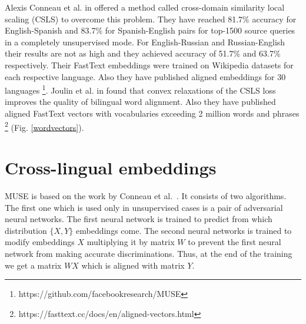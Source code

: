 \documentclass[11pt,a4paper]{article}
\begin{document}
Alexis Conneau et al. in \citeyear{muse} offered a method called cross-domain similarity local scaling (CSLS) to overcome this problem. They have reached 81.7\% accuracy for English-Spanish and 83.7\% for Spanish-English pairs for top-1500 source queries in a completely unsupervised mode. For English-Russian and Russian-English their results are not as high and they achieved accuracy of 51.7\% and 63.7\% respectively. Their FastText embeddings were trained on Wikipedia datasets for each respective language. Also they have published aligned embeddings for 30 languages \footnote{https://github.com/facebookresearch/MUSE}. Joulin et al. in \citeyear{joulin2018loss} found that convex relaxations of the CSLS loss improves the quality of bilingual word alignment. Also they have published aligned FastText vectors with vocabularies exceeding 2 million words and phrases \footnote{https://fasttext.cc/docs/en/aligned-vectors.html} (Fig. \ref*{wordvectors}).

\section{Cross-lingual embeddings}

MUSE is based on the work by Conneau et al.~\cite{muse}. It consists of two algorithms. The first one which is used only in unsupervised cases is a pair of adversarial neural networks. The first neural network is trained to predict from which distribution $\{X, Y\}$ embeddings come. The second neural networks is trained to modify embeddings $X$ multiplying it by matrix $W$ to prevent the first neural network from making accurate discriminations. Thus, at the end of the training we get a matrix $WX$ which is aligned with matrix $Y$.
\end{document}
